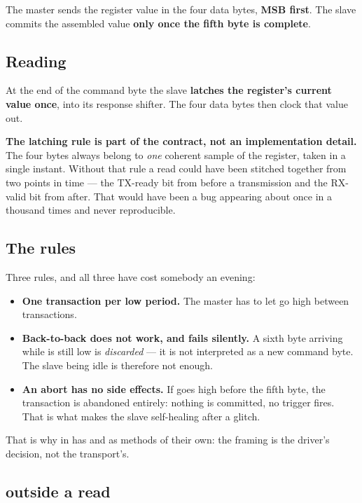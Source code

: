 The master sends the register value in the four data bytes, \textbf{MSB first}. The slave commits
the assembled value \textbf{only once the fifth byte is complete}.

\subsection{Reading}

At the end of the command byte the slave \textbf{latches the register's current value once}, into
its response shifter. The four data bytes then clock that value out.

\textbf{The latching rule is part of the contract, not an implementation detail.} The four bytes
always belong to \emph{one} coherent sample of the register, taken in a single instant. Without
that rule a  read could have been stitched together from two points in time --- the
TX-ready bit from before a transmission and the RX-valid bit from after. That would have been a
bug appearing about once in a thousand times and never reproducible.

\subsection{The \texorpdfstring{}{SS} rules}

Three rules, and all three have cost somebody an evening:

\begin{itemize}
  \item \textbf{One transaction per low  period.} The master has to let  go high
    between transactions.
  \item \textbf{Back-to-back does not work, and fails silently.} A sixth byte arriving while
     is still low is \emph{discarded} --- it is not interpreted as a new command byte.
    The slave being idle is therefore not enough.
  \item \textbf{An abort has no side effects.} If  goes high before the fifth byte, the
    transaction is abandoned entirely: nothing is committed, no trigger fires. That is what makes
    the slave self-healing after a glitch.
\end{itemize}

That is why  in  has  and  as
methods of their own: the framing is the driver's decision, not the transport's.

\subsection{\texorpdfstring{}{MISO} outside a read}

